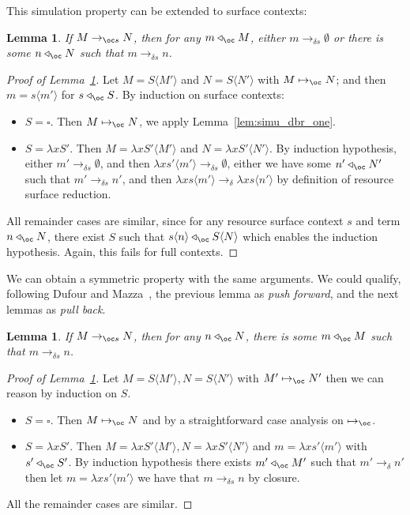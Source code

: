 \documentclass[10pt,a4paper]{article}
\newtheorem{lemma}[theorem]{Lemma}
\newcommand{\<}{\langle}
\renewcommand{\>}{\rangle}
\newcommand{\todb}{\mapsto_{\oc}} %
\newcommand{\todbs}{\to_{\oc s}} %
\newcommand{\todbr}{\to_{\delta}} %
\newcommand{\todbrs}{\to_{\delta s}} %
\newcommand{\app}{\triangleleft_\oc} %
\newcommand{\nativeemdash}{\ifmmode\text{\textemdash}\else\textemdash\fi}
\begin{document}
This simulation property can be extended to surface contexts:
\begin{lemma}
	\label{lem:simu_dbr}
	If $M\todbs N$, then for any $m\app M$, either $m\todbrs \emptyset$ or there is some $n\app N$ such
	that $m\todbrs n$.
\end{lemma}
\begin{proof}[Proof of Lemma~\ref{lem:simu_dbr}]
	Let $M=S\<M'\>$ and $N=S\<N'\>$ with $M\todb N$; and then $m=s\<m'\>$
	for $s\app S$.
	By induction on surface contexts:
	\begin{itemize}
		\item $S=\square$. Then $M\todb N$, we apply
			Lemma~\ref{lem:simu_dbr_one}.
		\item $S=\lambda x S'$. Then $M=\lambda xS'\<M'\>$ and
			$N=\lambda x S'\<N'\>$. By induction hypothesis, either
			$m'\todbrs \emptyset$, and then	$\lambda
			xs'\<m'\>\todbrs \emptyset$, either
			we have some $n'\app N'$ such that $m'\todbrs n'$, and
			then $\lambda xs\<m'\>\todbr \lambda xs\<n'\>$ by
			definition of resource surface reduction.
	\end{itemize}
	All remainder cases are similar, since for any resource surface context
	$s$ and term $n\app N$, there exist $S$ such that $s\<n\>\app
	S\<N\>$ which enables the induction hypothesis. Again, this fails for
	full contexts. 
\end{proof}


We can obtain a symmetric property with the same arguments. We could qualify,
following Dufour and Mazza~\cite{mazza-dufour}, the previous lemma as
\emph{push forward}, and the next lemmas as \emph{pull back}.
\begin{lemma}
	\label{lem:simu_dbr_bis}
	If $M\todbs N$, then for any $n\app N$, there is some $m\app M$ such
	that $m\todbrs n$.
\end{lemma}

\begin{proof}[Proof of Lemma~\ref{lem:simu_dbr_bis}]
	Let $M = S\langle M'\rangle, N = S\langle N'\rangle$ with $M' \todb N'$ then
	we can reason by induction on $S$.
	\begin{itemize}
		\item $S = \square$. Then $M \todb N$ and by a straightforward case
		analysis on $\todb$.
		\item $S = \lambda xS'$. Then $M = \lambda x S'\langle M'\rangle, N =
		\lambda x S'\langle N'\rangle$ and $m = \lambda x s' \langle m' \rangle$
		with $s'\app S'$. By induction hypothesis there exists $m' \app M'$ such
		that $m' \todbr n'$ then let $m = \lambda x s'\langle m'\rangle$ we
		have that $m \todbrs n$ by closure.
	\end{itemize}
	All the remainder cases are similar.
\end{proof}
\end{document}
